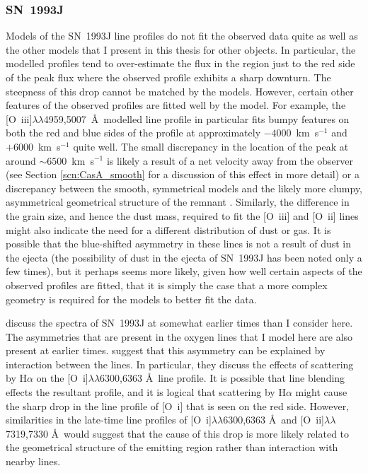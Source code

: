\subsubsection{SN~1993J}

Models of the SN~1993J line profiles do not fit the observed data quite as well as the other models that I present in this thesis for other objects.  In particular, the modelled profiles tend to over-estimate the flux in the region just to the red side of the peak flux where the observed profile exhibits a sharp downturn.  The steepness of this drop cannot be matched by the models.  However, certain other features of the observed profiles are fitted well by the model.  For example, the [O~{\sc iii}]$\lambda\lambda$4959,5007~\AA\  modelled line profile in particular fits bumpy features on both the red and blue sides of the profile at approximately $-4000$~km~s$^{-1}$ and $+6000$~km~s$^{-1}$ quite well.  The small discrepancy in the location of the peak at around $\sim6500$~km~s$^{-1}$ is likely a result of a net velocity away from the observer (see Section \ref{scn:CasA_smooth} for a discussion of this effect in more detail) or a discrepancy between the smooth, symmetrical models and the likely more clumpy, asymmetrical geometrical structure of the remnant \citep{Tran1997}.  Similarly, the difference in the grain size, and hence the dust mass, required to fit the [O~{\sc iii}] and [O~{\sc ii}] lines might also indicate the need for a different distribution of dust or gas.  It is possible that the blue-shifted asymmetry in these lines is not a result of dust in the ejecta (the possibility of dust in the ejecta of SN~1993J has been noted only a few times), but it perhaps seems more likely, given how well certain aspects of the observed profiles are fitted, that it is simply the case that a more complex geometry is required for the models to better fit the data.

\citet{Houck1996} discuss the spectra of SN~1993J at somewhat earlier times than I consider here.  The asymmetries that are present in the oxygen lines that I model here are also present at earlier times.  \citet{Houck1996} suggest that  this asymmetry can be explained by interaction between the lines.  In particular, they discuss the effects of scattering by H$\alpha$ on the [O~{\sc i}]$\lambda\lambda$6300,6363 \AA\ line profile.  It is possible that line blending effects the resultant profile, and it is logical that scattering by H$\alpha$ might cause the sharp drop in the line profile of [O~{\sc i}] that is seen on the red side.  However, similarities in the late-time line profiles of [O~{\sc i}]$\lambda\lambda$6300,6363 \AA\ and [O~{\sc ii}]$\lambda\lambda$7319,7330 \AA\ would suggest that  the cause of this drop is more likely related to the geometrical structure of the emitting region rather than interaction with nearby lines.

